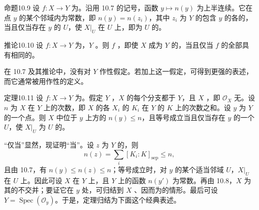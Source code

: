 \begin{SGAresult}{命题}{10.9}
设 $f\colon X\to Y$ 为。沿用 10.7 的记号，函数 $y\mapsto n(y)$ 为上半连续。它在点 $y$ 的某个邻域内为常数，即 $n(y)=n(z_i)$，其中 $z_i$ 为 $Y$ 的包含 $y$ 的各的，当且仅当存在 $y$ 的 $U$，使 $X|_U$ 在 $U$ 上，即为 $U$ 的。
\end{SGAresult}
\begin{SGAresult}{推论}{10.10}
设 $f\colon X\to Y$ 为，$Y$ 。则 $f$ ，即使 $X$ 成为 $Y$ 的，当且仅当 $f$ 的全部具有相同的。
\end{SGAresult}
在 10.7 及其推论中，没有对 $Y$ 作性假定。若加上这一假定，可得到更强的表述，而它通常被用作性的定义。
\begin{SGAresult}{定理}{10.11}
设 $f\colon X\to Y$ 为。假定 $Y$ ，$X$ 的每个分支都于 $Y$，且 $X$ ，即 $\mathcal O_X$ 无。设 $n$ 为 $X$ 在 $Y$ 上的次数，即 $X$ 的各 $X_i$ 的 $K_i$ 在 $Y$ 的 $K$ 上的次数之和。设 $y$ 为 $Y$ 的一个点。则 $X$ 中位于 $y$ 上方的 $n(y)\leq n$，且等号成立当且仅当存在 $y$ 的一个 $U$，使 $X|_U$ 为 $U$ 的。
\end{SGAresult}
“仅当”显然，现证明“当”。设 $z$ 为 $Y$ 的，则
\[
 n(z)=\sum_i[K_i:K]_{\mathrm{sep}}\leq n,
\]
且由 10.7，有 $n(y)\leq n(z)\leq n$；等号成立时，对 $y$ 的某个适当邻域 $U$，$X|_U$ 在 $U$ 上。因此可设 $X$ 在 $Y$ 上，且 $Y$ 上的函数 $n(y')$ 为常数。再由 10.8，$X$ 为其的不交并；要证它在 $y$ 处，可归结到 $X$ 、因而为的情形。最后可设 $Y=\operatorname{Spec}(\mathcal O_y)$。于是，定理归结为下面这个经典表述。

